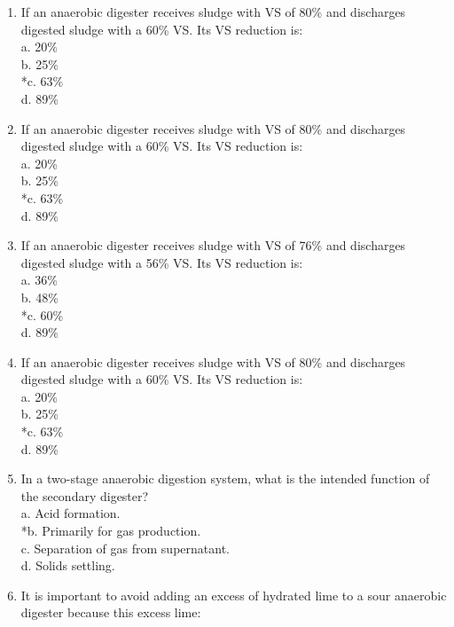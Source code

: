 \documentclass{article}
\begin{document}
\begin{enumerate}
\item  If an anaerobic digester receives sludge with VS of 80\% and discharges digested sludge with a 60\% VS.  Its VS reduction is: \\

a. 20\% \\
b. 25\% \\
*c. 63\% \\
d. 89\% \\

\item  If an anaerobic digester receives sludge with VS of 80\% and discharges digested sludge with a 60\% VS.  Its VS reduction is: \\

a. 20\% \\
b. 25\% \\
*c. 63\% \\
d. 89\% \\

\item  If an anaerobic digester receives sludge with VS of 76\% and discharges digested sludge with a 56\% VS.  Its VS reduction is: \\

a. 36\% \\
b. 48\% \\
*c. 60\% \\
d. 89\% \\

\item  If an anaerobic digester receives sludge with VS of 80\% and discharges digested sludge with a 60\% VS.  Its VS reduction is: \\

a. 20\% \\
b. 25\% \\
*c. 63\% \\
d. 89\% \\

\item  In a two-stage anaerobic digestion system, what is the intended function of the secondary digester? \\

a. Acid formation. \\
*b. Primarily for gas production. \\
c. Separation of gas from supernatant. \\
d. Solids settling. \\

\item  It is important to avoid adding an excess of hydrated lime to a sour anaerobic digester because this excess lime: \\


\end{enumerate}
\end{document}
